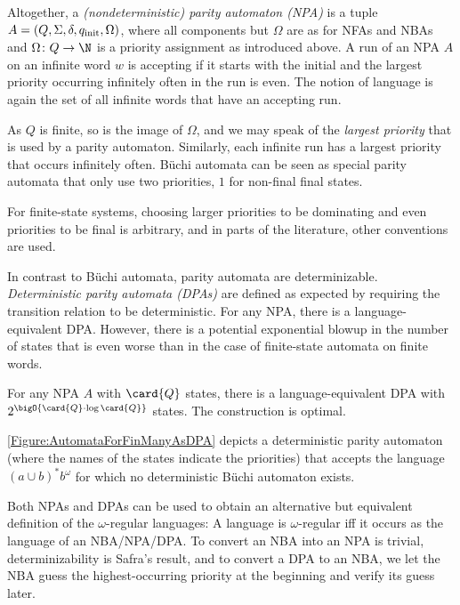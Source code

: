 \documentclass[../../diss.tex]{subfiles}
\begin{document}
Altogether, a \emph{(nondeterministic) parity automaton (NPA)} is a tuple
$A = (Q, \Sigma, \delta, q_{\text{init}}, \Omega)$, where all components but $\Omega$ are as for NFAs and NBAs and $\Omega \colon Q \to \N$ is a priority assignment as introduced above.
A run of an NPA $A$ on an infinite word $w$ is accepting if it starts with the initial  and the largest priority occurring infinitely often in the run is even.
The notion of language is again the set of all infinite words that have an accepting run.

As $Q$ is finite, so is the image of $\Omega$, and we may speak of the \emph{largest priority} that is used by a parity automaton.
Similarly, each infinite run has a largest priority that occurs infinitely often.
Büchi automata can be seen as special parity automata that only use two priorities, $1$ for non-final  final states.

\begin{remark*}
    For finite-state systems, choosing larger priorities to be dominating and even priorities to be final is arbitrary, and in parts of the literature, other conventions are used.
\end{remark*}

In contrast to Büchi automata, parity automata are determinizable.
\emph{Deterministic parity automata (DPAs)} are defined as expected by requiring the transition relation to be deterministic.
For any NPA, there is a language-equivalent DPA.\@
However, there is a potential exponential blowup in the number of states that is even worse than in the case of finite-state automata on finite words.

\begin{theorem}
    For any NPA $A$ with $\card{Q}$ states, there is a language-equivalent DPA with $2^{\bigO{\card{Q} \cdot \log \card{Q}}}$ states.
    The construction is optimal.
\end{theorem}

\cref{Figure:AutomataForFinManyAsDPA} depicts a deterministic parity automaton (where the names of the states indicate the priorities) that accepts the language ${(a \cup b)}^* b^\omega$ for which no deterministic Büchi automaton exists.

Both NPAs and DPAs can be used to obtain an alternative but equivalent definition of the $\omega$-regular languages:
A language is $\omega$-regular iff it occurs as the language of an NBA/NPA/DPA.\@
To convert an NBA into an NPA is trivial, determinizability is Safra's result, and to convert a DPA to an NBA, we let the NBA guess the highest-occurring priority at the beginning and verify its guess later.
\end{document}

